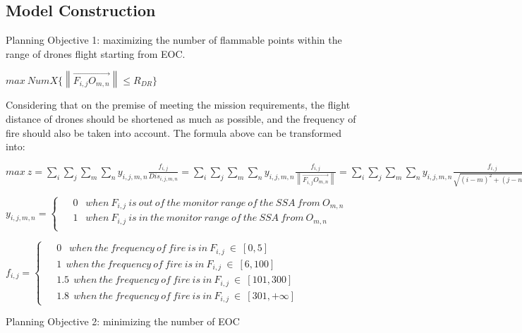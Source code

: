 \documentclass{mcmthesis}
\begin{document}
\subsection{Model Construction}


Planning Objective 1: maximizing the number of flammable points within the range of drones flight starting from EOC.

\begin{center}
  $max\ NumX\{\left \| \overrightarrow{F_{i,j}O_{m,n} }  \right \| \le R_{DR}\}$
\end{center}



Considering that on the premise of meeting the mission requirements, the flight distance of drones should be shortened as much as possible, and the frequency of fire should also be taken into account. The formula above can be transformed into:

\begin{center}
  
$
max~z=\sum_{i}^{} \sum_{j}^{} \sum_{m}^{} \sum_{n}^{} y_{i,j,m,n}\frac{f_{i,j}}{Dis_{i,j,m,n}} 
=\sum_{i}^{} \sum_{j}^{} \sum_{m}^{} \sum_{n}^{} y_{i,j,m,n}\frac{f_{i,j}}{\left \| \overrightarrow{F_{i,j}O_{m,n}}  \right \| } 
=\sum_{i}^{} \sum_{j}^{} \sum_{m}^{} \sum_{n}^{} y_{i,j,m,n}\frac{f_{i,j}}{ \sqrt{(i-m)^2+(j-n)^2}   } 
$


$
y_{i,j,m,n}=
\begin{cases}
  & \text{ 0 }~~when~ F_{i,j}~ is ~out ~of ~ the ~monitor ~range ~of ~the ~SSA ~from ~O_{m,n}  \\
  & \text{ 1 }~~ when~ F_{i,j}~ is~ in ~ the~ monitor~ range ~of ~the ~SSA ~from ~O_{m,n}  \\  
\end{cases}
$

$
f_{i,j}=\begin{cases}
  & \text{ 0 }~~ when~ the ~frequency~ of ~fire~ is~ in~ F_{i,j} ~\in ~[0,5] \\
  & \text{ 1}~~ when~ the ~frequency~ of ~fire~ is~ in~ F_{i,j} ~\in ~[6,100] \\
  & \text{ 1.5}~~ when~ the ~frequency~ of ~fire~ is~ in~ F_{i,j} ~\in ~[101,300] \\
  & \text{ 1.8}~~ when~ the ~frequency~ of ~fire~ is~ in~ F_{i,j} ~\in ~[301,+\infty ] 
\end{cases}
$
\end{center}

Planning Objective 2: minimizing the number of EOC
\end{document}
